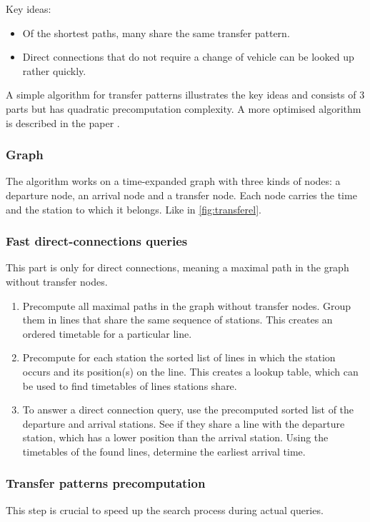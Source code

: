 Key ideas:
\begin{itemize}
    \item Of the shortest paths, many share the same transfer pattern.
    \item Direct connections that do not require a change of vehicle can be looked up rather quickly. 
\end{itemize}
A simple algorithm for transfer patterns illustrates the key ideas and consists of 3 parts but has quadratic precomputation complexity. A more optimised algorithm is described in the paper \cite{bast_fast_2010}.
\subsubsection{Graph}
The algorithm works on a time-expanded graph with three kinds of nodes: a departure node, an arrival node and a transfer node. Each node carries the time and the station to which it belongs. Like in \autoref{fig:transferel}.

\subsubsection{Fast direct-connections queries}
This part is only for direct connections, meaning a maximal path in the graph without transfer nodes.

\begin{enumerate}
    \item Precompute all maximal paths in the graph without transfer nodes. Group them in lines that share the same sequence of stations. This creates an ordered timetable for a particular line.
    \item Precompute for each station the sorted list of lines in which the station occurs and its position(s) on the line. This creates a lookup table, which can be used to find timetables of lines stations share.
    \item To answer a direct connection query, use the precomputed sorted list of the departure and arrival stations. See if they share a line with the departure station, which has a lower position than the arrival station. Using the timetables of the found lines, determine the earliest arrival time.
\end{enumerate}
\subsubsection{Transfer patterns precomputation}
This step is crucial to speed up the search process during actual queries. 

